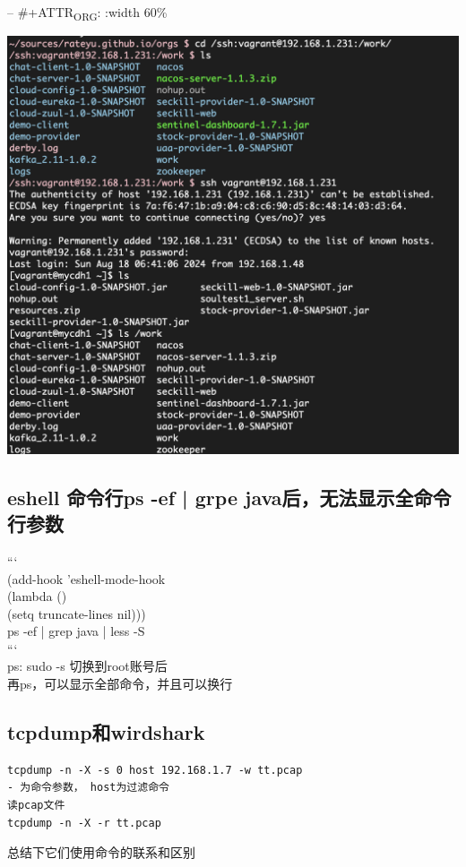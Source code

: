 \documentclass[11pt]{article}
\begin{document}
-- \#+ATTR\textsubscript{ORG}: :width 60\%\\
\begin{center}
\includegraphics[width=.9\linewidth]{emacs_magit,org-mod/2024-08-18_06-46-51_screenshot.png}
\end{center}

\subsection{eshell 命令行ps -ef | grpe java后，无法显示全命令行参数}
\label{sec:org7062f8e}

```\\
(add-hook 'eshell-mode-hook\\
          (lambda ()\\
            (setq truncate-lines nil)))\\

ps -ef | grep java | less -S\\

```\\

ps: sudo -s 切换到root账号后\\
再ps，可以显示全部命令，并且可以换行\\

\subsection{tcpdump和wirdshark}
\label{sec:orge9a4238}
\begin{verbatim}
tcpdump -n -X -s 0 host 192.168.1.7 -w tt.pcap
- 为命令参数， host为过滤命令
读pcap文件
tcpdump -n -X -r tt.pcap
\end{verbatim}
总结下它们使用命令的联系和区别\\
\end{document}
